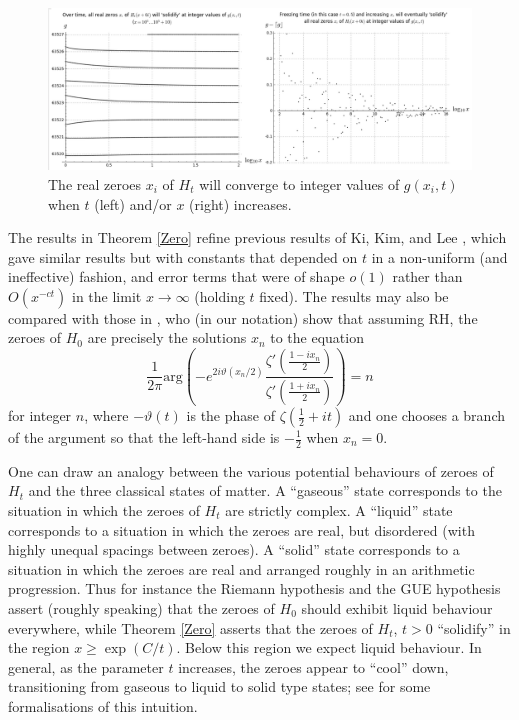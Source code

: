\begin{figure}[h!]
  \includegraphics[width=1.0\linewidth]{Integerconvergence_t_and_x_direction.png}
  \caption{The real zeroes $x_i$ of $H_t$ will converge to integer values of $g(x_i,t)$ when $t$ (left) and/or $x$ (right) increases.}
\label{integer_conv_zeros}
\end{figure}

The results in Theorem \ref{Zero} refine previous results of Ki, Kim, and Lee \cite[Theorems 1.3, 1.4]{kkl}, which gave similar results but with constants that depended on $t$ in a non-uniform (and ineffective) fashion, and error terms that were of shape $o(1)$ rather than $O(x^{-ct})$ in the limit $x \to \infty$ (holding $t$ fixed).  The results may also be compared with those in \cite{arias-lune}, who (in our notation) show that assuming RH, the zeroes of $H_0$ are precisely the solutions $x_n$ to the equation
$$ \frac{1}{2\pi} \mathrm{arg}\left( - e^{2 i \vartheta(x_n/2)} \frac{\zeta'(\frac{1-ix_n}{2})}{\zeta'(\frac{1+ix_n}{2})}\right) = n $$
for integer $n$, where $-\vartheta(t)$ is the phase of $\zeta(\frac{1}{2}+it)$ and one chooses a branch of the argument so that the left-hand side is $-\frac{1}{2}$ when $x_n=0$.

\begin{remark}  One can draw an analogy between the various potential behaviours of zeroes of $H_t$ and the three classical states of matter.  A ``gaseous'' state corresponds to the situation in which the zeroes of $H_t$ are strictly complex.  A ``liquid'' state corresponds to a situation in which the zeroes are real, but disordered (with highly unequal spacings between zeroes).  A ``solid'' state corresponds to a situation in which the zeroes are real and arranged roughly in an arithmetic progression.  Thus for instance the Riemann hypothesis and the GUE hypothesis assert (roughly speaking) that the zeroes of $H_0$ should exhibit liquid behaviour everywhere, while Theorem \ref{Zero} asserts that the zeroes of $H_t$, $t>0$ ``solidify'' in the region $x \geq \exp(C/t)$.  Below this region we expect liquid behaviour.  In general, as the parameter $t$ increases, the zeroes appear to ``cool'' down, transitioning from gaseous to liquid to solid type states; see \cite{brad} for some formalisations of this intuition.
\end{remark}

